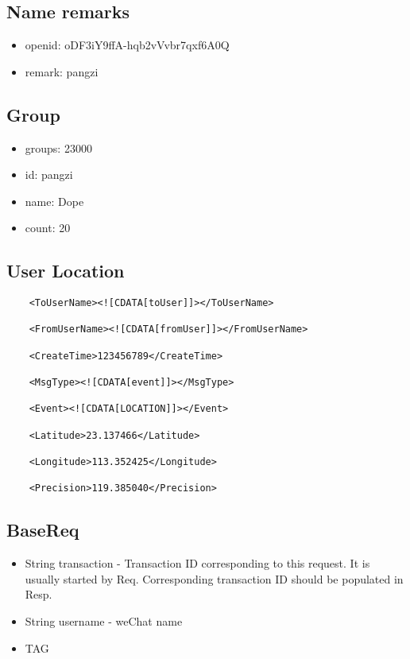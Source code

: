 \documentclass{article}
\begin{document}
\subsection{Name remarks}
\begin{itemize}
	\item openid: oDF3iY9ffA-hqb2vVvbr7qxf6A0Q
	\item remark: pangzi
\end{itemize}

\subsection{Group}
\begin{itemize}
	\item groups: 23000
	\item id: pangzi
	\item name: Dope
	\item count: 20
\end{itemize}

\subsection{User Location}
	\begin{verbatim}
	<ToUserName><![CDATA[toUser]]></ToUserName>

	<FromUserName><![CDATA[fromUser]]></FromUserName>

	<CreateTime>123456789</CreateTime>

	<MsgType><![CDATA[event]]></MsgType>

	<Event><![CDATA[LOCATION]]></Event>

	<Latitude>23.137466</Latitude>

	<Longitude>113.352425</Longitude>

	<Precision>119.385040</Precision>
	\end{verbatim}


\subsection{BaseReq}
\begin{itemize}
	\item String transaction - Transaction ID corresponding to this request. It is usually started by Req. Corresponding transaction ID should be populated in Resp. 
	\item String username - weChat name
	\item TAG
\end{itemize}
\end{document}
